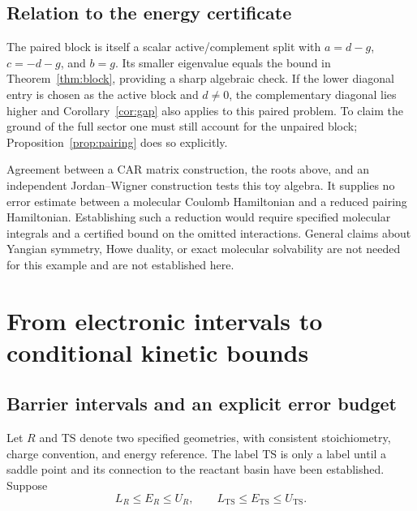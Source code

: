 \documentclass[11pt,a4paper]{article}
\theoremstyle{plain}
\theoremstyle{definition}
\theoremstyle{remark}
\begin{document}
\subsection{Relation to the energy certificate}
The paired block is itself a scalar active/complement split with
$a=d-g$, $c=-d-g$, and $b=g$. Its smaller eigenvalue equals the bound
in Theorem~\ref{thm:block}, providing a sharp algebraic check. If the lower
diagonal entry is chosen as the active block and $d\ne0$, the complementary
diagonal lies higher and Corollary~\ref{cor:gap} also applies to this paired
problem. To claim the ground of the full sector one must still account for
the unpaired block; Proposition~\ref{prop:pairing} does so explicitly.

Agreement between a CAR matrix construction, the roots above, and an
independent Jordan--Wigner construction tests this toy algebra. It supplies no
error estimate between a molecular Coulomb Hamiltonian and a reduced pairing
Hamiltonian. Establishing such a reduction would require specified molecular
integrals and a certified bound on the omitted interactions. General claims
about Yangian symmetry, Howe duality, or exact molecular solvability are not
needed for this example and are not established here.

\section{From electronic intervals to conditional kinetic bounds}
\label{sec:approximations}
\subsection{Barrier intervals and an explicit error budget}
Let $R$ and $\mathrm{TS}$ denote two specified geometries, with consistent
stoichiometry, charge convention, and energy reference. The label
$\mathrm{TS}$ is only a label until a saddle point and its connection to the
reactant basin have been established. Suppose
\[
 L_R\le E_R\le U_R,\qquad
 L_{\mathrm{TS}}\le E_{\mathrm{TS}}\le U_{\mathrm{TS}}.
\]
\end{document}
